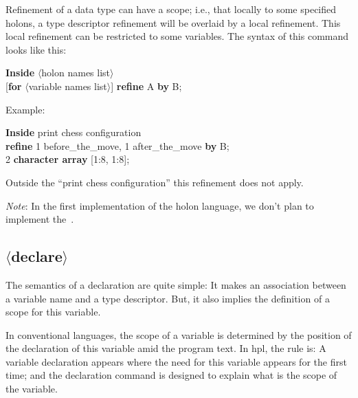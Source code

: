 \documentclass[openany,nobib]{tufte-book}
\newcommand{\kw}[1]{{\bf #1}}
\newcommand{\sym}[1]{$\langle$#1$\rangle$}
\begin{document}
Refinement of a data type can have a scope; i.e., that locally to some
specified holons, a type descriptor refinement will be overlaid by a local
refinement. This local refinement can be restricted to some variables. The
syntax of this command looks like this:

\medskip

\-\hspace{0.8cm} \kw{Inside} \sym{holon names list}\\
\-\hspace{3cm} [\kw{for} \sym{variable names list}] \kw{refine} A \kw{by} B;

\medskip\noindent
Example:
\medskip

\-\hspace{0.8cm} \kw{Inside} print chess configuration\\
\-\hspace{2cm} \kw{refine} 1 before\_the\_move, 1 after\_the\_move \kw{by}
B;\\
\-\hspace{3cm} 2 \kw{character array} [1:8, 1:8];

\medskip\noindent
Outside the ``print chess configuration'' this refinement does not apply.

\medskip\noindent
{\sl Note}: In the first implementation of the holon language, we don't plan to
implement the~.

\subsection{\sym{declare}}

The semantics of a declaration are quite simple: It makes an association
between a variable name and a type descriptor. But, it also implies the
definition of a scope for this variable.

In conventional languages, the scope of a variable is determined by the
position of the declaration of this variable amid the program text. In {\sc
hpl}, the rule is: A variable declaration appears where the need for this
variable appears for the first time; and the declaration command is designed to
explain what is the scope of the variable.
\end{document}

